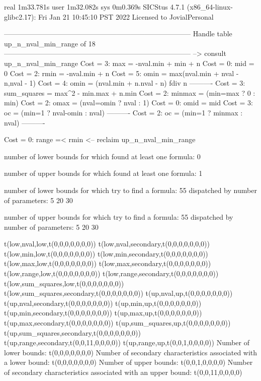 real	1m33.781s
user	1m32.082s
sys	0m0.369s
SICStus 4.7.1 (x86_64-linux-glibc2.17): Fri Jan 21 10:45:10 PST 2022
Licensed to JovialPersonal


--------------------------------------------------------------------------------
Handle table up_n_nval_min_range of 18
--------------------------------------------------------------------------------
--> consult up_n_nval_min_range
Cost =  3:  max         = -nval.min + min + n
Cost =  0:  mid         = 0
Cost =  2:  rmin        = -nval.min + n
Cost =  5:  omin        = max(nval.min + nval - n,nval - 1)
Cost =  4:  omin        = (nval.min + n.nval - n) fdiv n
----------
Cost =  3:  sum_squares = max^2 - min.max + n.min
Cost =  2:  minmax      = (min=max ? 0 : min)
Cost =  2:  omax        = (nval=omin ? nval : 1)
Cost =  0:  omid        = mid
Cost =  3:  oc          = (min=1 ? nval-omin : nval)
----------
Cost =  2:  oc          = (min=1 ? minmax : nval)
----------

Cost =  0:  range =< rmin
<-- reclaim up_n_nval_min_range

number of lower bounds for which found at least one formula: 0

number of upper bounds for which found at least one formula: 1

number of lower bounds for which try to find a formula: 55
dispatched by number of parameters: 5  20  30

number of upper bounds for which try to find a formula: 55
dispatched by number of parameters: 5  20  30

t(low,nval,low,t(0,0,0,0,0,0,0))
t(low,nval,secondary,t(0,0,0,0,0,0,0))
t(low,min,low,t(0,0,0,0,0,0,0))
t(low,min,secondary,t(0,0,0,0,0,0,0))
t(low,max,low,t(0,0,0,0,0,0,0))
t(low,max,secondary,t(0,0,0,0,0,0,0))
t(low,range,low,t(0,0,0,0,0,0,0))
t(low,range,secondary,t(0,0,0,0,0,0,0))
t(low,sum_squares,low,t(0,0,0,0,0,0,0))
t(low,sum_squares,secondary,t(0,0,0,0,0,0,0))
t(up,nval,up,t(0,0,0,0,0,0,0))
t(up,nval,secondary,t(0,0,0,0,0,0,0))
t(up,min,up,t(0,0,0,0,0,0,0))
t(up,min,secondary,t(0,0,0,0,0,0,0))
t(up,max,up,t(0,0,0,0,0,0,0))
t(up,max,secondary,t(0,0,0,0,0,0,0))
t(up,sum_squares,up,t(0,0,0,0,0,0,0))
t(up,sum_squares,secondary,t(0,0,0,0,0,0,0))
t(up,range,secondary,t(0,0,11,0,0,0,0))
t(up,range,up,t(0,0,1,0,0,0,0))
Number of lower bounds:                                             t(0,0,0,0,0,0,0)
Number of secondary characteristics associated with a lower bound:  t(0,0,0,0,0,0,0)
Number of upper bounds:                                             t(0,0,1,0,0,0,0)
Number of secondary characteristics associated with an upper bound: t(0,0,11,0,0,0,0)

